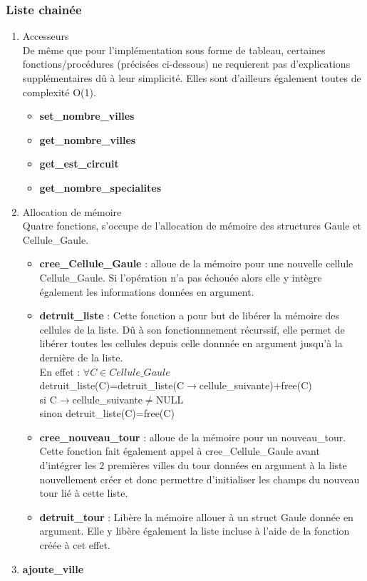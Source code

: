 \documentclass[a4paper, 11pt, oneside]{article}
\begin{document}
\subsubsection{Liste chainée}
\begin{enumerate}
    \item Accesseurs 
    \\De même que pour l'implémentation sous forme de tableau, certaines fonctions/procédures
    (précisées ci-dessous) ne requierent pas d'explications supplémentaires dû à leur simplicité. 
    Elles sont d'ailleurs également toutes de complexité O(1).
    \begin{itemize}
        \item \textbf{set\_nombre\_villes}
        \item \textbf{get\_nombre\_villes}
        \item \textbf{get\_est\_circuit}
        \item \textbf{get\_nombre\_specialites}
    \end{itemize}
    \item Allocation de mémoire
    \\Quatre fonctions, s'occupe de l'allocation de mémoire des structures Gaule et 
    \\Cellule\_Gaule. 
    \begin{itemize}
        \item \textbf{cree\_Cellule\_Gaule} : alloue de la mémoire pour une nouvelle cellule Cellule\_Gaule.
        Si l'opération n'a pas échouée alors elle y intègre également les informations données en argument.
        \item \textbf{detruit\_liste} : Cette fonction a pour but de libérer la mémoire des cellules 
        de la liste. Dû à son fonctionnnement récurssif, elle permet de libérer toutes les cellules depuis celle donnnée 
        en argument jusqu'à la dernière de la liste.
        \\En effet : $\forall C \in Cellule\_Gaule$
        \\detruit\_liste(C)=detruit\_liste(C$\rightarrow$cellule\_suivante)+free(C) 
        \\si C$\rightarrow$cellule\_suivante$\ne$NULL
        \\sinon detruit\_liste(C)=free(C)
        \item \textbf{cree\_nouveau\_tour} : alloue de la mémoire pour un nouveau\_tour. Cette fonction 
        fait également appel à cree\_Cellule\_Gaule avant d'intégrer les 2 premières villes du tour 
        données en argument à la liste nouvellement créer et donc permettre d'initialiser les champs 
        du nouveau tour lié à cette liste.
        \item \textbf{detruit\_tour} : Libère la mémoire allouer à un struct Gaule donnée en argument. 
        Elle y libère également la liste incluse à l'aide de la fonction créée à cet effet.
    \end{itemize}
    \item \textbf{ajoute\_ville}
    
\end{enumerate}
\end{document}
